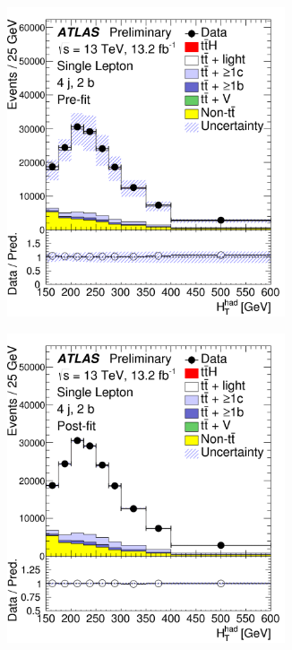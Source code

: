 \begin{figure}[htbp!]
\begin{subfigure}{0.24\textwidth}
  \centering
  \includegraphics[width=0.9\textwidth]{figures/ttH/fig_07a.png}
  \caption{}
  \label{}
\end{subfigure}
\begin{subfigure}{0.24\textwidth}
  \centering
  \includegraphics[width=0.9\textwidth]{figures/ttH/fig_07b.png}

\end{subfigure}
\end{figure}
